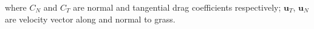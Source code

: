 \documentclass[aps,preprint,floatfix,prl]{revtex4-1}
\newcommand{\bu}{\mathbf{u}}
\newcommand{\del}{\partial}
\begin{document}

where $C_{N}$ and $C_{T}$ are normal and tangential drag coefficients respectively; $\bu_{T}$, $\bu_{N}$ are velocity vector along and normal to grass.
  
\end{document}
